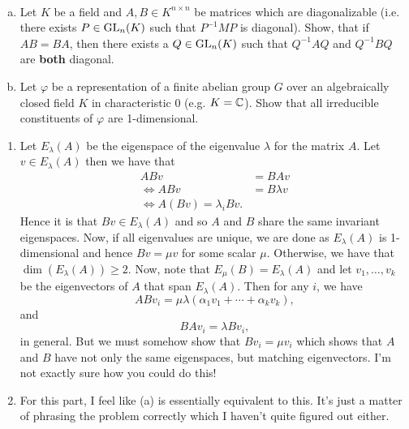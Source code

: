 \documentclass[leqno]{article}
\begin{document}
\newpage
\begin{problem}~
\begin{enumerate}[(a)]
    \item Let $K$ be a field and $A,B \in K^{n\times n}$ be matrices which are diagonalizable (i.e. there exists $P\in \mathrm{GL}_n(K)$ such that $P^{-1}MP$ is diagonal). Show, that if $AB=BA$, then there exists a $Q\in \mathrm{GL}_n(K)$ such that $Q^{-1}AQ$ and $Q^{-1}BQ$ are \textbf{both} diagonal.
    \item Let $\varphi$ be a representation of a finite abelian group $G$ over an algebraically closed field $K$ in characteristic 0 (e.g. $K=\mathbb{C}$). Show that all irreducible constituents of $\varphi$ are 1-dimensional.
\end{enumerate}
\end{problem}
\begin{solution}
\begin{enumerate}
    \item Let $E_\lambda(A)$ be the eigenspace of the eigenvalue $\lambda$ for the matrix $A$. Let $v\in E_\lambda(A)$ then we have that
\begin{align*}
    ABv&=BAv\\
    \iff ABv&= B\lambda v\\
    \iff A(Bv)=\lambda_i Bv.
\end{align*}
Hence it is that $Bv\in E_\lambda(A)$ and so $A$ and $B$ share the same invariant eigenspaces.  Now, if all eigenvalues are unique, we are done as $E_\lambda(A)$ is 1-dimensional and hence $Bv=\mu v$ for some scalar $\mu$.  Otherwise, we have that $\dim(E_\lambda(A))\geq 2$.  Now, note that $E_{\mu}(B)=E_\lambda(A)$ and let $v_1,\dots,v_k$ be the eigenvectors of $A$ that span $E_\lambda(A)$. Then for any $i$, we have
\[
ABv_i =\mu \lambda (\alpha_1 v_1 + \cdots + \alpha_k v_k),
\]
and
\[
BAv_i = \lambda Bv_i,
\]
in general. But we must somehow show that $Bv_i = \mu v_i$ which shows that $A$ and $B$ have not only the same eigenspaces, but matching eigenvectors. I'm not exactly sure how you could do this!
\item For this part, I feel like (a) is essentially equivalent to this. It's just a matter of phrasing the problem correctly which I haven't quite figured out either.
\end{enumerate}




\end{solution}
\end{document}
